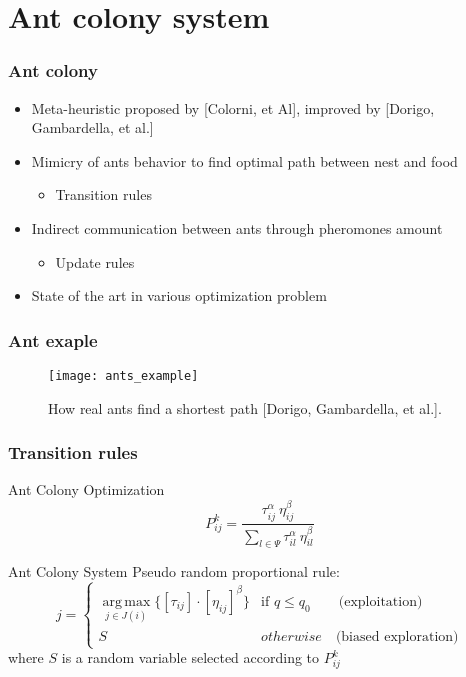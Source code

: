 \section{Ant colony system}

\begin{frame} \frametitle{Ant colony} 

\begin{itemize}[<+->]
	\item Meta-heuristic proposed by [Colorni, et Al], improved by [Dorigo, Gambardella, et al.]
	\item Mimicry of ants behavior to find optimal path between nest and food
	\begin{itemize}
		\item Transition rules
	\end{itemize}
	\item Indirect communication between ants through pheromones amount
	\begin{itemize}
		\item Update rules
	\end{itemize}
	\item State of the art in various optimization problem
\end{itemize}

\end{frame}


\begin{frame}\frametitle{Ant exaple}
\begin{figure}[t]
	\label{fig:ants}
	\centering
	\texttt{[image: ants\_example]}
	\caption{How real ants find a shortest path [Dorigo, Gambardella, et al.].}
\end{figure}
\end{frame}


\begin{frame} \frametitle{Transition rules} 

\begin{block}{Ant Colony Optimization}
\begin{equation*}
P_{ij}^{k} = \frac{\tau_{ij}^{\alpha}~\eta_{ij}^{\beta}}{\sum_{l\in\Psi}\tau_{il}^{\alpha}~\eta_{il}^{\beta}}
\end{equation*}	
\end{block}

\begin{block}{Ant Colony System}
Pseudo random proportional rule:
\begin{equation*}
j = 
\begin{cases} 
\displaystyle\operatorname*{arg\,max}_{j\in J(i)} \{ {[\tau_{ij}]\cdot[\eta_{ij}]^{\beta}} \} & \text{if } q\leq q_0 \quad\quad \text{(exploitation)} \\
S & otherwise \quad \text{(biased exploration)}
\end{cases}
\end{equation*}
where $S$ is a random variable selected according to $P_{ij}^{k}$ 
\end{block}

\end{frame}



